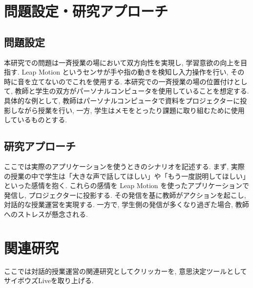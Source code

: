 \documentclass{funthesis}
\begin{document}



\chapter{問題設定・研究アプローチ} %

\section{問題設定}

本研究での問題は一斉授業の場において双方向性を実現し, 学習意欲の向上を目指す. Leap Motion というセンサが手や指の動きを検知し入力操作を行い, その時に音を立てないのでこれを使用する. 本研究での一斉授業の場の位置付けとして, 教師と学生の双方がパーソナルコンピュータを使用していることを想定する. 具体的な例として, 教師はパーソナルコンピュータで資料をプロジェクターに投影しながら授業を行い, 一方, 学生はメモをとったり課題に取り組むために使用しているものとする.


\section{研究アプローチ}
ここでは実際のアプリケーションを使うときのシナリオを記述する. まず, 実際の授業の中で学生は「大きな声で話してほしい」や「もう一度説明してほしい」といった感情を抱く. これらの感情を Leap Motion を使ったアプリケーションで発信し, プロジェクターに投影する. その発信を基に教師がアクションを起こし, 対話的な授業運営を実現する. 一方で, 学生側の発信が多くなり過ぎた場合, 教師へのストレスが懸念される. 

\chapter{関連研究}
ここでは対話的授業運営の関連研究としてクリッカーを, 意思決定ツールとしてサイボウズLiveを取り上げる.
\end{document}
